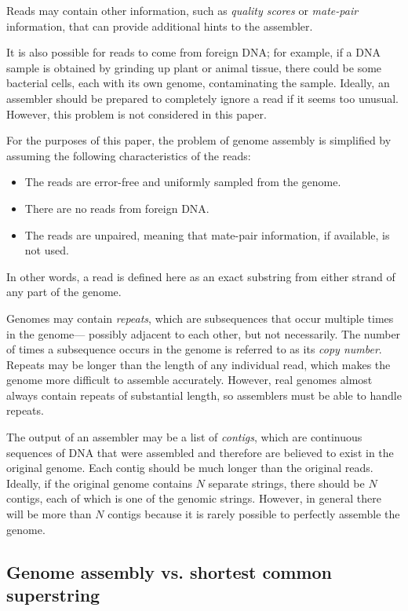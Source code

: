 \documentclass[12pt]{article}
\newcommand{\KeyTerm}[1]{{\it #1}}
\begin{document}
Reads may contain other information, such as \KeyTerm{quality scores} or
\KeyTerm{mate-pair} information, that can provide additional hints to the
assembler.

It is also possible for reads to come from foreign DNA; for example, if a DNA
sample is obtained by grinding up plant or animal tissue, there could be some
bacterial cells, each with its own genome, contaminating the sample.  Ideally,
an assembler should be prepared to completely ignore a read if it seems too
unusual.  However, this problem is not considered in this paper.

For the purposes of this paper, the problem of genome assembly is simplified by
assuming the following characteristics of the reads:

\begin{itemize}
	\item The reads are error-free and uniformly sampled from the genome.
	\item There are no reads from foreign DNA.
	\item The reads are unpaired, meaning that mate-pair information, if
available, is not used.
\end{itemize}

In other words, a read is defined here as an exact substring from either strand
of any part of the genome.

Genomes may contain \KeyTerm{repeats}, which are subsequences that occur
multiple times in the genome--- possibly adjacent to each other,
but not necessarily.  The number of times a
subsequence occurs in the genome is referred to as its \KeyTerm{copy number}.
Repeats may be longer than the length of any individual read, which makes the
genome more difficult to assemble accurately.  However, real genomes almost
always contain repeats of substantial length, so assemblers must be able to
handle repeats.

The output of an assembler may be a list of \KeyTerm{contigs}, which are
continuous sequences of DNA that were assembled and therefore are believed to
exist in the original genome.  Each contig should be much longer than the
original reads.  Ideally, if the original genome contains $N$ separate strings,
there should be $N$ contigs, each of which is one of the genomic strings.
However, in general there will be more than $N$ contigs because it is rarely
possible to perfectly assemble the genome.

\subsection{Genome assembly vs. shortest common superstring}
\end{document}
